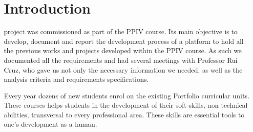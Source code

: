 \documentclass[a4paper,12pt,journal,twoside,compsoc]{PPIEEEtran}
\begin{document}

\maketitle

\IEEEdisplaynontitleabstractindextext
\IEEEpeerreviewmaketitle
\section{Introduction}
% 
% 
 project was commissioned as part of the PPIV course. Its main objective is to develop, document and report the development process of a platform to hold all the previous works and projects developed within the PPIV course. As such we documented all the requirements and had several meetings with Professor Rui Cruz, who gave us not only the necessary information we needed, as well as the analysis criteria and requirements specifications.

Every year dozens of new students enrol on the existing Portfolio curricular units. These courses helps students in the development of their soft-skills, non technical abilities, transversal to every professional area. These skills are essential tools to one's development as a human.
\end{document}
